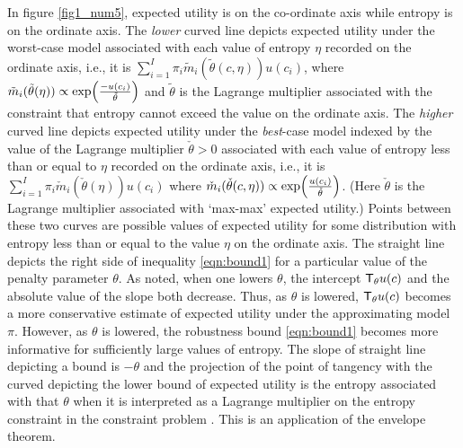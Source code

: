 In figure \ref{fig1_num5}, expected utility is on the co-ordinate axis while entropy is on the ordinate axis.  %
 The {\em lower} curved line depicts  expected utility under the worst-case model %
 associated with each  value of entropy $\eta$ recorded on the ordinate axis, i.e., it is
 $\sum_{i=1}^I \pi_i \tilde m_i (\tilde \theta(c,\eta)) u(c_i)$, where
 $\tilde m_i (\tilde \theta(\eta)) \propto \exp \Bigl(\frac{-u(c_i)}{\tilde \theta}\Bigr)$ and  $\tilde \theta$ is the Lagrange multiplier associated  with the constraint that entropy cannot exceed the value on the ordinate axis.
 The {\em higher} curved line depicts expected utility under the {\em best}-case model indexed by the value of the Lagrange multiplier $\check \theta >0 $
 associated with each value of entropy less than or equal to $\eta$ recorded on the ordinate axis, i.e., it is $\sum_{i=1}^I \pi_i \check m_i (\check \theta(\eta)) u(c_i)$ where
 $\check m_i (\check \theta(c,\eta)) \propto \exp \Bigl(\frac{u(c_i)}{\check \theta}\Bigr)$.
 (Here $\check \theta$ is the Lagrange multiplier associated with `max-max' expected utility.)
 Points  between these two curves are possible values of expected utility for some distribution  with entropy less than or equal to the value $\eta$ on the ordinate axis.
  The  straight line depicts the right side of inequality \eqref{eqn:bound1} for a particular  value of the penalty parameter $\theta$.  As noted, when one lowers
$\theta$,  the intercept ${\sf T}_\theta u(c)$ and the absolute value of the slope both decrease.  Thus, as $\theta$ is lowered, ${\sf T}_\theta u(c)$ becomes a more conservative
estimate of expected utility under the approximating model $\pi$.  However, as $\theta$ is lowered, the robustness bound \eqref{eqn:bound1} becomes more informative for sufficiently
large values of entropy.
The slope of  straight line  depicting a bound is $-\theta$ and the projection of the point of tangency with the curved depicting
 the lower bound of expected utility is the entropy associated with that $\theta$ when it is interpreted as a Lagrange multiplier
 on the entropy constraint in the constraint problem .  This is an application of the envelope theorem.



